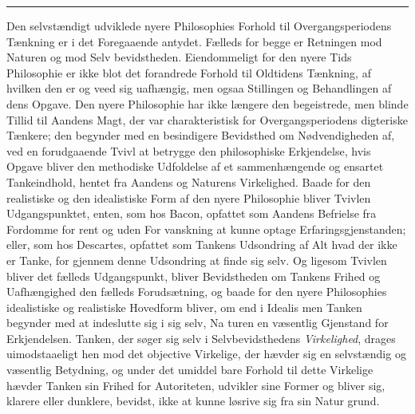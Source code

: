 \documentclass[12pt,a4paper]{book}
\newcommand{\divrule}{\begin{center}\rule{2cm}{0.4pt}\end{center}}
\begin{document}
\divrule

Den selvstændigt udviklede nyere Philosophies Forhold til
Overgangsperiodens Tænkning er i det Foregaaende antydet.
Fælleds for begge er Retningen mod Naturen og mod Selv\-%
bevidstheden. Eiendommeligt for den nyere Tids Philosophie
er ikke blot det forandrede Forhold til Oldtidens Tænkning, af
hvilken den er og veed sig uafhængig, men ogsaa Stillingen
og Behandlingen af dens Opgave. Den nyere Philosophie har
ikke længere den begeistrede, men blinde Tillid til Aandens
Magt, der var charakteristisk for Overgangsperiodens digteriske
Tænkere; den begynder med en besindigere Bevidsthed om
Nødvendigheden af, ved en forudgaaende Tvivl at betrygge den
philosophiske Erkjendelse, hvis Opgave bliver den methodiske
Udfoldelse af et sammenhængende og ensartet Tankeindhold,
hentet fra Aandens og Naturens Virkelighed. Baade for den
realistiske og den idealistiske Form af den nyere Philosophie
bliver Tvivlen Udgangspunktet, enten, som hos Bacon, opfattet
som Aandens Befrielse fra Fordomme for rent og uden For\-%
vanskning at kunne optage Erfaringsgjenstanden; eller, som
hos Descartes, opfattet som Tankens Udsondring af Alt hvad
der ikke er Tanke, for gjennem denne Udsondring at finde sig
selv. Og ligesom Tvivlen bliver det fælleds Udgangspunkt,
bliver Bevidstheden om Tankens Frihed og Uafhængighed den
fælleds Forudsætning, og baade for den nyere Philosophies
idealistiske og realistiske Hovedform bliver, om end i Idealis\-%
men Tanken begynder med at indeslutte sig i sig selv, Na\-%
turen en væsentlig Gjenstand for Erkjendelsen. Tanken, der
søger sig selv i Selvbevidsthedens \emph{Virkelighed}, drages
uimodstaaeligt hen mod det objective Virkelige, der hævder sig
en selvstændig og væsentlig Betydning, og under det umiddel\-%
bare Forhold til dette Virkelige hævder Tanken sin Frihed for
Autoriteten, udvikler sine Former og bliver sig, klarere eller
dunklere, bevidst, ikke at kunne løsrive sig fra sin Natur\-%
grund.
\end{document}
